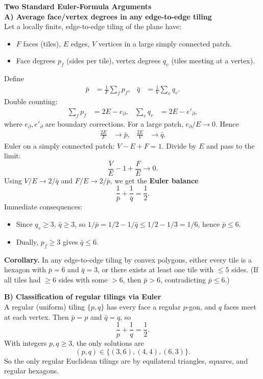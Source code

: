 \begin{technical}
{\Large\textbf{Two Standard Euler-Formula Arguments}}\\[0.3em]

\textbf{A) Average face/vertex degrees in any edge-to-edge tiling}\\[0.2em]
Let a locally finite, edge-to-edge tiling of the plane have:
\begin{itemize}[topsep=0pt,itemsep=2pt]
\item $F$ faces (tiles), $E$ edges, $V$ vertices in a large simply connected patch.
\item Face degrees $p_f$ (sides per tile), vertex degrees $q_v$ (tiles meeting at a vertex).
\end{itemize}
Define
\begin{align*}
\bar{p} &= \frac{1}{F}\sum_f p_f, & \bar{q} &= \frac{1}{V}\sum_v q_v.
\end{align*}
Double counting:
\begin{align*}
\sum_f p_f &= 2E - e_\partial, & \sum_v q_v &= 2E - e'_\partial,
\end{align*}
where $e_\partial, e'_\partial$ are boundary corrections. For a large patch, $e_\partial/E \to 0$. Hence
\begin{align*}
\frac{2E}{F} &\to \bar{p}, & \frac{2E}{V} &\to \bar{q}.
\end{align*}
Euler on a simply connected patch: $V - E + F = 1$. Divide by $E$ and pass to the limit:
\[
\frac{V}{E} - 1 + \frac{F}{E} \to 0.
\]
Using $V/E \to 2/\bar{q}$ and $F/E \to 2/\bar{p}$, we get the \textbf{Euler balance}
\[
\boxed{\frac{1}{\bar{p}} + \frac{1}{\bar{q}} = \frac{1}{2}}.
\]
Immediate consequences:
\begin{itemize}[topsep=0pt,itemsep=2pt]
\item Since $q_v \geq 3$, $\bar{q} \geq 3$, so $1/\bar{p} = 1/2 - 1/\bar{q} \leq 1/2 - 1/3 = 1/6$, hence $\boxed{\bar{p} \leq 6}$.
\item Dually, $p_f \geq 3$ gives $\boxed{\bar{q} \leq 6}$.
\end{itemize}

\textbf{Corollary.} In any edge-to-edge tiling by convex polygons, either every tile is a hexagon with $\bar{p} = 6$ and $\bar{q} = 3$, or there exists at least one tile with $\leq 5$ sides.
(If all tiles had $\geq 6$ sides with some $> 6$, then $\bar{p} > 6$, contradicting $\bar{p} \leq 6$.)

\textbf{B) Classification of regular tilings via Euler}\\[0.2em]
A regular (uniform) tiling $\{p,q\}$ has every face a regular $p$-gon, and $q$ faces meet at each vertex. Then $\bar{p} = p$ and $\bar{q} = q$, so
\[
\frac{1}{p} + \frac{1}{q} = \frac{1}{2}.
\]
With integers $p, q \geq 3$, the only solutions are
\[
(p,q) \in \{(3,6), (4,4), (6,3)\}.
\]
So the only regular Euclidean tilings are by equilateral triangles, squares, and regular hexagons.
\end{technical}
